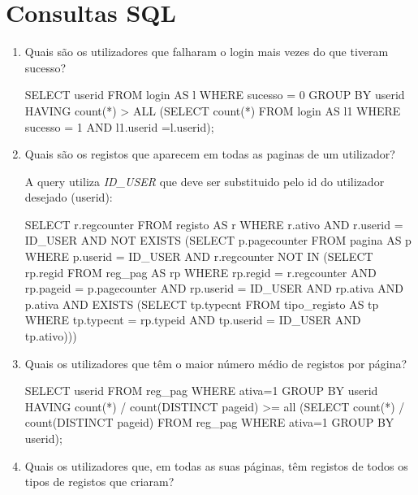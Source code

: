 \documentclass[11pt,a4paper]{article}
\begin{document}
\section{Consultas SQL}
\begin{enumerate}[label=(\alph*)]
	\item Quais são os utilizadores que falharam o login mais vezes do que tiveram sucesso?
	
		\begin{code}[language=SQL]
SELECT userid
FROM login AS l
WHERE sucesso = 0
GROUP BY userid
HAVING count(*) > ALL
    (SELECT count(*)
     FROM login AS l1
     WHERE sucesso = 1
         AND l1.userid =l.userid);
		\end{code}

	\item Quais são os registos que aparecem em todas as paginas de um utilizador?
	
	A query utiliza \textit{ID\_USER} que deve ser substituido pelo id do utilizador desejado (userid):
		\begin{code}[language=SQL]
SELECT r.regcounter
FROM registo AS r
WHERE r.ativo
    AND r.userid = ID_USER
    AND NOT EXISTS
        (SELECT p.pagecounter
         FROM pagina AS p
         WHERE p.userid = ID_USER
             AND r.regcounter NOT IN
                 (SELECT rp.regid
                  FROM reg_pag AS rp
                  WHERE rp.regid = r.regcounter
                      AND rp.pageid = p.pagecounter
                      AND rp.userid = ID_USER
                      AND rp.ativa
                      AND p.ativa
                      AND EXISTS
                          (SELECT tp.typecnt
                           FROM tipo_registo AS tp
                           WHERE tp.typecnt = rp.typeid
                               AND tp.userid = ID_USER
                               AND tp.ativo)))
        		\end{code}
	\item Quais os utilizadores que têm o maior número médio de registos por página?
	
		\begin{code}[language=SQL]
SELECT userid
FROM reg_pag
WHERE ativa=1
GROUP BY userid
HAVING count(*) / count(DISTINCT pageid) >= all
    (SELECT count(*) / count(DISTINCT pageid)
     FROM reg_pag
     WHERE ativa=1
     GROUP BY userid);
		\end{code}
	
	\item Quais os utilizadores que, em todas as suas páginas, têm registos de todos os tipos de registos que criaram?
\end{enumerate}
\end{document}
